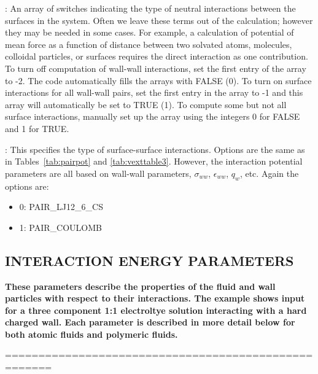\documentclass[10pt,onecolumn]{article}
\begin{document}
\vspace{0.1in}
:  An array of switches indicating the type of neutral
interactions between the surfaces in the system.  Often we leave these terms
out of the calculation; however they may be needed in some cases.  For example, 
a calculation of potential of mean force as a function
of distance between two solvated atoms, molecules, colloidal particles, or surfaces requires the 
direct interaction as one contribution.  
To turn off computation of wall-wall interactions, set the first entry of the array to -2.  The code 
automatically fills the arrays with FALSE (0).   To turn on surface interactions for all wall-wall 
pairs, set the first entry in the array to -1 and this array will automatically be set to TRUE (1).  To compute some but not all surface interactions, manually set
up the array using the integers 0 for FALSE and 1 for TRUE.

\noindent\dotfill

\vspace{0.1in}
\vspace{0.1in}
:
This specifies the type of surface-surface interactions.  Options are the same as in Tables~\ref{tab:pairpot} and \ref{tab:vexttable3}.  However, the interaction potential parameters are all based on wall-wall parameters, $\sigma_{ww}$, $\epsilon_{ww}$, $q_w$, etc.  Again the options are:
\begin{itemize}
\item{0: PAIR\_LJ12\_6\_CS}
\item{1: PAIR\_COULOMB}
\end{itemize}

\noindent\dotfill

\vfill
\break


\subsection{INTERACTION ENERGY PARAMETERS}
{\bf
These parameters describe the properties of the fluid and wall
particles with respect to their interactions.
The example shows input for a three component 1:1 electroltye solution
interacting with a hard charged wall.
Each parameter is described in more detail below for both atomic
fluids and polymeric fluids. }

\vspace{0.1in}
\noindent=====================================================
\end{document}
